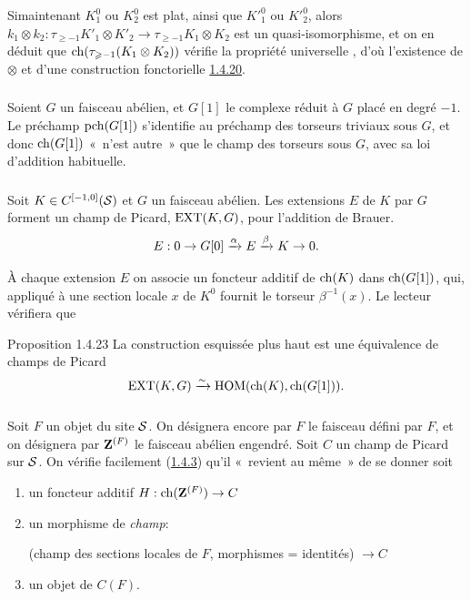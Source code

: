 \documentclass[10pt]{../fichiers-configuration-latex/smfart}
\begin{document}
Si\pageoriginale maintenant $K^0_{1}$ ou $K^0_{2}$ est plat,
ainsi que ${K'}^0_{1}$ ou ${K'}^0_{2}$, alors
$k_{1}\otimes k_{2}:\tau_{\geq -1}{K'}_{1}\otimes {K'}_{2}\rightarrow
\tau_{\geq -1}K_{1}\otimes K_{2}$ est un quasi-isomorphisme, et on en
déduit que $\operatorname{ch}(\tau_{\geqslant -1}(K_{1}\otimes K_{2}))$ vérifie la
propriété universelle , d'où l'existence de $\otimes$ et
d'une construction fonctorielle \hyperref[XVIII.const1.4.20]{1.4.20}. 

\setcounter{subsubsection}{20}
\subsubsection{}
Soient $G$ un faisceau
abélien, et $G[1]$ le complexe réduit à $G$ placé en degré $-1$. Le
préchamp $\operatorname{pch}(G[1])$ s'identifie au préchamp des torseurs triviaux
sous $G$, et donc $\operatorname{ch}(G[1])$ « n'est autre »  que le champ des
torseurs sous $G$, avec sa loi d'addition habituelle.

\subsubsection{}
Soit $K\in C^{[-1,0]}({\mathcal S})$ et $G$ un faisceau abélien. Les
extensions $E$ de $K$ par $G$ forment un champ de Picard, $\operatorname{EXT}(K,G)$,
pour l'addition de Brauer.
$$
E:0\rightarrow
G[0]\xrightarrow{\alpha}E\xrightarrow{\beta}K\rightarrow 0{}.
$$

À chaque extension $E$ on associe un foncteur additif de $\operatorname{ch}(K)$ dans
$\operatorname{ch}(G[1])$, qui, appliqué à une section locale $x$ de $K^{0}$ fournit
le torseur $\beta^{-1}(x)$. Le lecteur vérifiera que

\begin{enonce*}{Proposition 1.4.23}
La construction esquissée plus haut est une équivalence de champs de
Picard
$$
\operatorname{EXT}(K,G)\xrightarrow{\sim} \operatorname{HOM}(\operatorname{ch}(K),\operatorname{ch}(G[1])){}.
$$
\end{enonce*}

\setcounter{subsubsection}{23}
\subsubsection{}
Soit $F$ un objet du site ${\mathcal S}$. On désignera encore par $F$
le faisceau défini par $F$, et on désignera par $\mathbf{Z}^{(F)}$ le
faisceau abélien engendré. Soit $C$ un champ de Picard sur
${\mathcal S}$. On vérifie facilement (\cf \hyperref[XVIII.lem1.4.3]{1.4.3}) qu'il « revient au même »  de se donner soit
\begin{enumerate}
\renewcommand{\theenumi}{\alph{enumi}}
\renewcommand{\labelenumi}{\theenumi)}
\item un foncteur additif $H:\operatorname{ch}(\mathbf{Z}^{(F)})\rightarrow C$

\item un morphisme de \emph{champ}:

(champ des sections locales de $F$, morphismes = identités)
$\rightarrow C$

\item un objet de $C(F)$.
\end{enumerate}
\end{document}
